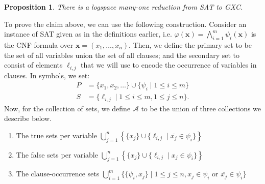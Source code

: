 \documentclass[a4paper]{article}
\newtheorem{proposition}{Proposition}
\renewcommand{\vec}[1]{\boldsymbol{#1}}
\begin{document}
\begin{proposition}
  There is a logspace many-one reduction from \textsc{SAT} to \textsc{GXC}.
\end{proposition}
To prove the claim above, we can use the following construction. Consider an
instance of \textsc{SAT} given as in the definitions earlier, i.e.
$\varphi(\vec{x}) = \bigwedge_{i=1}^m \psi_i(\vec{x})$ is the CNF formula over
$\vec{x} = (x_1, \dots, x_n)$. Then, we define the primary set to be the set
of all variables union the set of all clauses; and the secondary set to
consist of elements $\ell_{i,j}$ that we will use to encode the occurrence of
variables in clauses. In symbols, we set:
\begin{align*}
  P & {} = \{x_1, x_2, \dots\} \cup \{\psi_i \mid 1 \leq i \leq m\}\\
  S & {} = \{\ell_{i,j} \mid 1 \leq i \leq m, 1 \leq j \leq n\}.
\end{align*}
Now, for the collection of sets, we define $\mathcal{A}$ to be the union of
three collections we describe below.
\begin{enumerate}
  \item The true sets per variable $\bigcup_{j=1}^{n} \left\{\{x_j\} \cup \{
    \ell_{i,j} \mid \overline{x_j} \in \psi_i\} \right\}$
  \item The false sets per variable $\bigcup_{j=1}^{n} \left\{\{x_j\} \cup \{
    \ell_{i,j} \mid x_j \in \psi_i\} \right\}$
  \item The clause-occurrence sets $\bigcup_{i=1}^{m} \{ \{ \psi_i, x_j \} \mid
    1 \leq j \leq n, x_j \in \psi_i \text{ or } \overline{x_j} \in \psi_i\}$
\end{enumerate}
\end{document}
